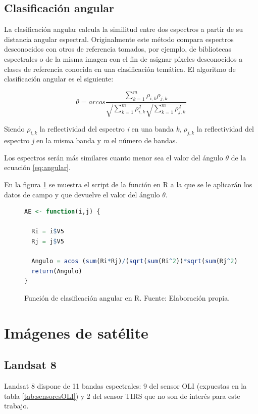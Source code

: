 \subsection{Clasificación angular}
La clasificación angular calcula la similitud entre dos espectros a partir de su distancia angular espectral. Originalmente este método compara espectros desconocidos con otros de referencia tomados, por ejemplo, de bibliotecas espectrales o de la misma imagen \citep{girouard2004validated} con el fin de asignar píxeles desconocidos a clases de referencia conocida en una clasificación temática. El algoritmo de clasificación angular es el siguiente:

\begin{equation} \label{eq:angular}
	\theta = arcos \frac{\sum_{k=1}^{m} \rho_{i,k} \rho_{j,k}}{\sqrt{\sum_{k=1}^{m} \rho_{i,k}^{2}} \sqrt{\sum_{k=1}^{m} \rho_{j,k}^{2}}}
\end{equation}

Siendo $\rho_{i,k}$ la reflectividad del espectro \textit{i} en una banda \textit{k}, $\rho_{j,k}$ la reflectividad del espectro \textit{j} en la misma banda y \textit{m} el número de bandas.\Sep

Los espectros serán más similares cuanto menor sea el valor del ángulo $\theta$ de la ecuación \ref{eq:angular}.\Sep

En la figura \ref{fig:AE} se muestra el script de la función en R a la que se le aplicarán los datos de campo y que devuelve el valor del ángulo $\theta$.

\begin{figure}
\centering
\begin{lstlisting}[language = R, frame = single]
AE <- function(i,j) {
  
  Ri = i$V5
  Rj = j$V5

  Angulo = acos (sum(Ri*Rj)/(sqrt(sum(Ri^2))*sqrt(sum(Rj^2))))
  return(Angulo)
}
\end{lstlisting}
\caption[Función clasificación angular]{Función de clasificación angular en R. Fuente: Elaboración propia.}
\label{fig:AE}
\end{figure}

\section{Imágenes de satélite}
\subsection{Landsat 8}
Landsat 8 dispone de 11 bandas espectrales: 9 del sensor \ac{OLI} (expuestas en la tabla \ref{tab:sensoresOLI}) y 2 del sensor \ac{TIRS} que no son de interés para este trabajo.\Sep


